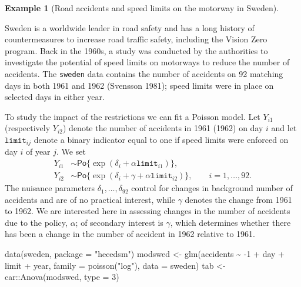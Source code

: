 \documentclass[
  11pt,
  letterpaper,
]{scrbook}
\newenvironment{Shaded}{\begin{snugshade}}{\end{snugshade}}
\newcommand{\AttributeTok}[1]{\textcolor[rgb]{0.40,0.45,0.13}{#1}}
\newcommand{\DecValTok}[1]{\textcolor[rgb]{0.68,0.00,0.00}{#1}}
\newcommand{\FunctionTok}[1]{\textcolor[rgb]{0.28,0.35,0.67}{#1}}
\newcommand{\NormalTok}[1]{\textcolor[rgb]{0.00,0.23,0.31}{#1}}
\newcommand{\OtherTok}[1]{\textcolor[rgb]{0.00,0.23,0.31}{#1}}
\newcommand{\SpecialCharTok}[1]{\textcolor[rgb]{0.37,0.37,0.37}{#1}}
\newcommand{\StringTok}[1]{\textcolor[rgb]{0.13,0.47,0.30}{#1}}
\theoremstyle{definition}
\theoremstyle{definition}
\newtheorem{example}{Example}[chapter]
\theoremstyle{remark}
\begin{document}
\begin{example}[Road accidents and speed limits on the motorway in
Sweden]\protect\hypertarget{exm-roadsweden}{}\label{exm-roadsweden}

Sweden is a worldwide leader in road safety and has a long history of
countermeasures to increase road traffic safety, including the Vision
Zero program. Back in the 1960s, a study was conducted by the
authorities to investigate the potential of speed limits on motorways to
reduce the number of accidents. The \texttt{sweden} data contains the
number of accidents on 92 matching days in both 1961 and 1962 (Svensson
1981); speed limits were in place on selected days in either year.

To study the impact of the restrictions we can fit a Poisson model. Let
\(Y_{i1}\) (respectively \(Y_{i2}\)) denote the number of accidents in
1961 (1962) on day \(i\) and let \(\texttt{limit}_{ij}\) denote a binary
indicator equal to one if speed limits were enforced on day \(i\) of
year \(j\). We set \begin{align*}
Y_{i1} &\sim \mathsf{Po}\{\exp(\delta_i + \alpha \texttt{limit}_{i1})\},
\\ Y_{i2} &\sim\mathsf{Po}\{\exp(\delta_i + \gamma +  \alpha \texttt{limit}_{i2})\}, \qquad i=1, \ldots, 92.
\end{align*} The nuisance parameters \(\delta_1, \ldots, \delta_{92}\)
control for changes in background number of accidents and are of no
practical interest, while \(\gamma\) denotes the change from 1961 to
1962. We are interested here in assessing changes in the number of
accidents due to the policy, \(\alpha\); of secondary interest is
\(\gamma\), which determines whether there has been a change in the
number of accident in 1962 relative to 1961.

\begin{Shaded}
\begin{Highlighting}[]
\FunctionTok{data}\NormalTok{(sweden, }\AttributeTok{package =} \StringTok{"hecedsm"}\NormalTok{)}
\NormalTok{modswed }\OtherTok{\textless{}{-}} \FunctionTok{glm}\NormalTok{(accidents }\SpecialCharTok{\textasciitilde{}} \SpecialCharTok{{-}}\DecValTok{1} \SpecialCharTok{+}\NormalTok{ day }\SpecialCharTok{+}\NormalTok{ limit }\SpecialCharTok{+}\NormalTok{ year,}
               \AttributeTok{family =} \FunctionTok{poisson}\NormalTok{(}\StringTok{"log"}\NormalTok{), }
               \AttributeTok{data =}\NormalTok{ sweden)}
\NormalTok{tab }\OtherTok{\textless{}{-}}\NormalTok{ car}\SpecialCharTok{::}\FunctionTok{Anova}\NormalTok{(modswed, }\AttributeTok{type =} \DecValTok{3}\NormalTok{)}
\end{Highlighting}
\end{Shaded}


\end{example}
\end{document}
